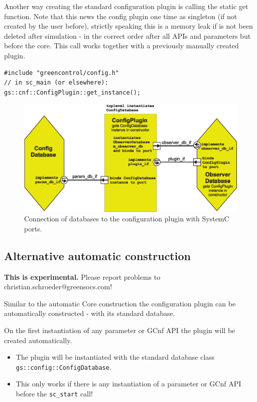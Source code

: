 \noindent
\begin{minipage}{\textwidth}
Another way creating the standard configuration plugin is calling the static get function. Note that this news the config plugin one time as singleton (if not created by the user before), strictly speaking this is a memory leak if is not been deleted after simulation - in the correct order after all APIs and parameters but before the core. This call works together with a previously manually created plugin.
\begin{lstlisting}
#include "greencontrol/config.h"
// in sc_main (or elsewhere):
gs::cnf::ConfigPlugin::get_instance();
\end{lstlisting}
\end{minipage}

\begin{figure}[htb]
	\centerline{
		\includegraphics[width=\textwidth]{ConfigPlugin_Ports.eps}}
	\caption{Connection of databases to the configuration plugin with SystemC ports.}
	\label{fig:ConfigPluginDatabaseConnection}
\end{figure}


\subsection{Alternative automatic construction}
\label{GCnfAutomaticConstruction}

 \textbf{This is experimental.} Please report problems to christian.schroeder@greensocs.com!

Similar to the automatic \GreenControl Core construction the configuration plugin can be automatically constructed - with its standard database.

On the first instantiation of any parameter or GCnf API the plugin will be created automatically.

\begin{itemize}
  \item The plugin will be instantiated with the standard database class \lstinline|gs::config::ConfigDatabase|.
  \item This only works if there is any instantiation of a parameter or GCnf API before the \lstinline|sc_start| call!
\end{itemize}


